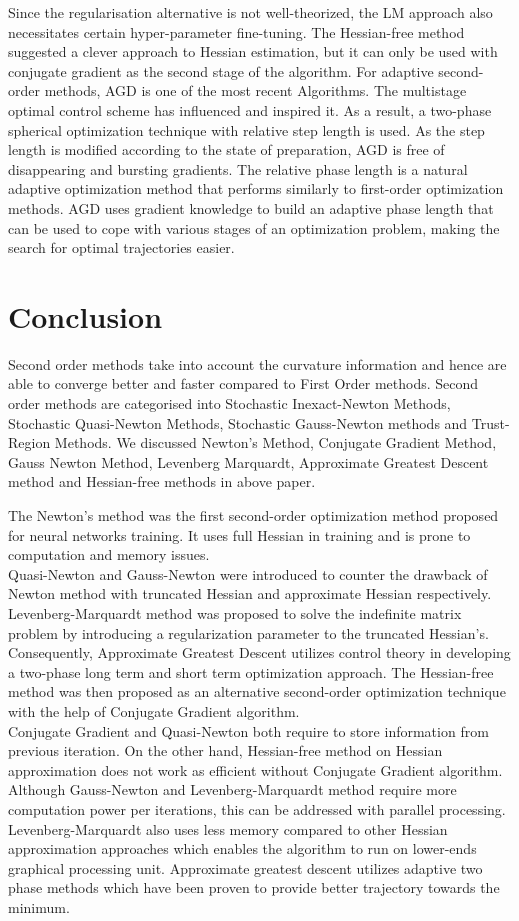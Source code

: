 \documentclass[journal]{IEEEtran}
\begin{document}
Since the regularisation alternative is not well-theorized, the LM approach also necessitates certain hyper-parameter fine-tuning. The Hessian-free method suggested a clever approach to Hessian estimation, but it can only be used with conjugate gradient as the second stage of the algorithm.
For adaptive second-order methods, AGD is one of the most recent Algorithms. The multistage optimal control scheme has influenced and inspired it. As a result, a two-phase spherical optimization technique with relative step length is used. As the step length is modified according to the state of preparation, AGD is free of disappearing and bursting gradients. The relative phase length is a natural adaptive optimization method that performs similarly to first-order optimization methods. AGD uses gradient knowledge to build an adaptive phase length that can be used to cope with various stages of an optimization problem, making the search for optimal trajectories easier.

\section{Conclusion}
Second order methods take into account the curvature information and hence are able to converge better and faster compared to  First Order methods. Second order methods are categorised into Stochastic Inexact-Newton Methods, Stochastic Quasi-Newton Methods, Stochastic Gauss-Newton methods and Trust-Region Methods. We discussed Newton's Method, Conjugate Gradient Method, Gauss Newton Method, Levenberg Marquardt, Approximate Greatest Descent method and Hessian-free methods in above paper. 

The Newton's method was the first second-order optimization method proposed for neural networks training. It uses full Hessian in training and is prone to computation and memory issues. \\
Quasi-Newton and Gauss-Newton were introduced to counter the drawback of Newton method with truncated Hessian and approximate Hessian respectively. Levenberg-Marquardt method was proposed to solve the indefinite matrix problem by introducing a regularization parameter to the truncated Hessian's. Consequently, Approximate Greatest Descent utilizes control theory in developing a two-phase long term and short term optimization approach. The Hessian-free method was then proposed as an alternative second-order optimization technique with the help of Conjugate Gradient algorithm. \\
Conjugate Gradient and Quasi-Newton both require to store information from previous iteration. On the other hand, Hessian-free method on Hessian approximation does not work as efficient without Conjugate Gradient algorithm. Although Gauss-Newton and Levenberg-Marquardt method require more computation power per iterations, this can be addressed with parallel processing. Levenberg-Marquardt also uses less memory compared to other Hessian approximation approaches which enables the algorithm to run on lower-ends graphical processing unit. Approximate greatest descent utilizes adaptive two phase methods which have been proven to provide better trajectory towards the minimum.

\printbibliography
\end{document}
